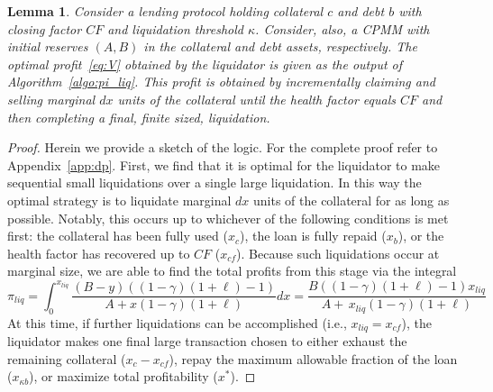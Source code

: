 \documentclass[11pt]{article} %
\newtheorem{lemma}[theorem]{Lemma}
\begin{document}
\begin{lemma} \label{prop:dp}
Consider a lending protocol holding collateral $c$ and debt $b$ with closing factor $CF$ and liquidation threshold $\kappa$. 
Consider, also, a CPMM with initial reserves $(A,B)$ in the collateral and debt assets, respectively.
The optimal profit~\eqref{eq:V} obtained by the liquidator is given as the output of Algorithm~\ref{algo:pi_liq}.
This profit is obtained by incrementally claiming and selling marginal $dx$ units of the collateral until the health factor equals $CF$ and then completing a final, finite sized, liquidation.
\end{lemma}
\begin{proof}
Herein we provide a sketch of the logic. For the complete proof refer to Appendix~\ref{app:dp}. 
First, we find that it is optimal for the liquidator to make sequential small liquidations over a single large liquidation. In this way the optimal strategy is to liquidate marginal $dx$ units of the collateral for as long as possible. Notably, this occurs up to whichever of the following conditions is met first: the collateral has been fully used ($x_c$), the loan is fully repaid ($x_b$), or the health factor has recovered up to $CF$ ($x_{cf}$). 
Because such liquidations occur at marginal size, we are able to find the total profits from this stage via the integral
\begin{equation}
    \pi_{liq}=\int_0^{x_{liq}} \frac{(B-y)((1-\gamma)(1+\ell)-1)}{A+x(1-\gamma)(1+\ell)}dx = \frac{B((1-\gamma)(1+\ell)-1)x_{liq} }{A+\,x_{liq}(1-\gamma)(1+\ell)} \label{eq:pi_liq}
\end{equation}
At this time, if further liquidations can be accomplished (i.e., $x_{liq} = x_{cf}$), the liquidator makes one final large transaction chosen to either exhaust the remaining collateral ($x_c - x_{cf}$), repay the maximum allowable fraction of the loan ($x_{\kappa b}$), or maximize total profitability ($x^*$).
\end{proof}
\end{document}
